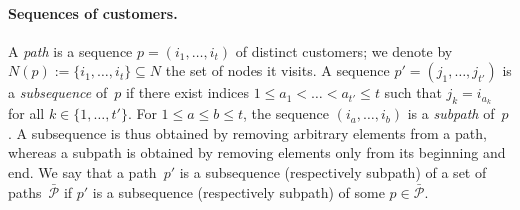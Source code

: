 \documentclass{article}
\begin{document}
\paragraph{Sequences of customers.} A \textit{path} is a sequence $p = (i_1, \dots, i_t)$ of distinct customers; we denote by $N(p) := \{i_1, \dots, i_t\} \subseteq N$ the set of nodes it visits. A sequence $p' = (j_1, \dots, j_{t'})$ is a \textit{subsequence} of~$p$ if there exist indices $1 \leq a_1 < \dots < a_{t'} \leq t$ such that $j_k = i_{a_k}$ for all $k \in \{1, \dots, t'\}$. For $1 \leq a \leq b \leq t$, the sequence $(i_a, \dots, i_b)$ is a \textit{subpath} of~$p$. A subsequence is thus obtained by removing arbitrary elements from a path, whereas a subpath is obtained by removing elements only from its beginning and end. We say that a path~$p'$ is a subsequence (respectively subpath) of a set of paths~$\bar{\mathcal{P}}$ if $p'$ is a subsequence (respectively subpath) of some $p \in \bar{\mathcal{P}}$.
\end{document}
